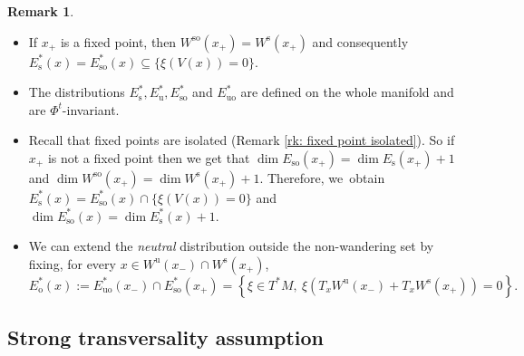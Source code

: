 \documentclass[11pt]{article}
\newcommand{\skpt}{\smallskip}
\newcommand{\ro}{\mathrm{o}}
\newcommand{\rs}{\mathrm{s}}
\newcommand{\rso}{\mathrm{so}}
\newcommand{\ru}{\mathrm{u}}
\newcommand{\ruo}{\mathrm{uo}}
\theoremstyle{definition}
\newtheorem{remark}[definition]{Remark}
\theoremstyle{plain}
\begin{document}
\pagebreak[2]
\skpt
\begin{remark}
\begin{itemize}
\item If $x_+$ is a fixed point, then $W^{\rso} (x_+) = W^{\rs} (x_+)$ and consequently $E_\rs^*(x) = E_{\rso}^*(x) \subseteq \{\xi (V(x)) = 0 \}$.
\item The distributions $E_\rs^*, E_\ru^*, E_{\rso}^*$ and $E_{\ruo}^*$ are defined on the whole manifold and are $\Phi^t$-invariant.
\item Recall that fixed points are isolated (Remark \ref{rk: fixed point isolated}). So if $x_+$ is not a fixed point then we get that $\dim E_{\rso}(x_+) = \dim E_{\rs}(x_+) + 1$ and $\dim W^{\rso} (x_+) = \dim W^{\rs} (x_+) + 1$. Therefore, we~obtain $E_{\rs}^* (x) = E_{\rso}^* (x) \cap \{\xi (V(x)) = 0 \}$ and $\dim E_{\rso}^* (x) = \dim E_{\rs}^* (x) + 1$.
\item We can extend the \textit{neutral} distribution outside the non-wandering set by fixing, for every $x \in W^\ru (x_-) \cap W^\rs (x_+)$,
\[
E_\ro^* (x):= E_{\ruo}^* (x_-) \cap E_{\rso}^* (x_+) = \left\{ \xi \in T^* M, \: \xi \left(T_x W^{\ru} (x_-) + T_x W^{\rs} (x_+)\right) = 0 \right\}.
\]
\end{itemize}
\end{remark}

\subsection{Strong transversality assumption}
\end{document}
